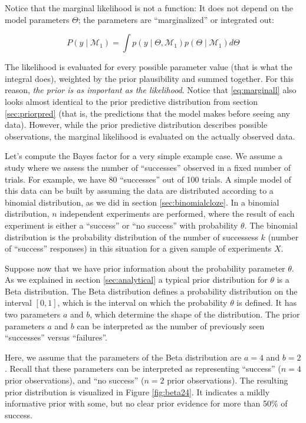 \documentclass[12pt,]{krantz}
\theoremstyle{definition}
\theoremstyle{definition}
\theoremstyle{definition}
\theoremstyle{remark}
\begin{document}
Notice that the marginal likelihood is not a function: It does not depend on the model parameters \(\Theta\); the parameters are ``marginalized'' or integrated out:

\begin{equation}
P(y \mid \mathcal{M}_1) = \int p(y \mid \Theta, \mathcal{M}_1) p(\Theta \mid \mathcal{M}_1) d \Theta
\label{eq:marginall}
\end{equation}

The likelihood is evaluated for every possible parameter value (that is what the integral does), weighted by the prior plausibility and summed together. For this reason, \emph{the prior is as important as the likelihood}. Notice that \eqref{eq:marginall} also looks almost identical to the prior predictive distribution from section \ref{sec:priorpred} (that is, the predictions that the model makes before seeing any data). However, while the prior predictive distribution describes possible observations, the marginal likelihood is evaluated on the actually observed data.

Let's compute the Bayes factor for a very simple example case. We assume a study where we assess the number of ``successes'' observed in a fixed number of trials. For example, we have 80 ``successes'' out of 100 trials. A simple model of this data can be built by assuming the data are distributed according to a binomial distribution, as we did in section \ref{sec:binomialcloze}.
In a binomial distribution, \(n\) independent experiments are performed, where the result of each experiment is either a ``success'' or ``no success'' with probability \(\theta\). The binomial distribution is the probability distribution of the number of successess \(k\) (number of ``success'' responses) in this situation for a given sample of experiments \(X\).

Suppose now that we have prior information about the probability parameter \(\theta\). As we explained in section \ref{sec:analytical} a typical prior distribution for \(\theta\) is a Beta distribution.
The Beta distribution defines a probability distribution on the interval \([0, 1]\), which is the interval on which the probability \(\theta\) is defined. It has two parameters \(a\) and \(b\), which determine the shape of the distribution. The prior parameters \(a\) and \(b\) can be interpreted as the number of previously seen ``successes'' versus ``failures''.

Here, we assume that the parameters of the Beta distribution are \(a=4\) and \(b=2\). Recall that these parameters can be interpreted as representing ``success'' (\(n=4\) prior observations), and ``no success'' (\(n=2\) prior observations). The resulting prior distribution is visualized in Figure \ref{fig:beta24}. It indicates a mildly informative prior with some, but no clear prior evidence for more than 50\% of success.
\end{document}
